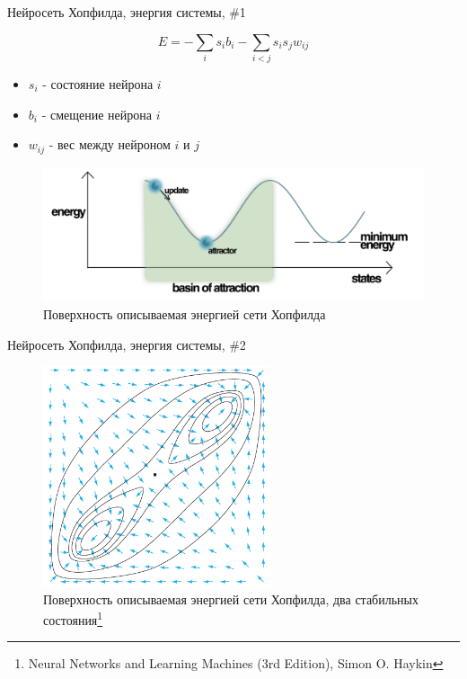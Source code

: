\documentclass[10pt]{beamer}
\begin{document}
\begin{frame}{Нейросеть Хопфилда, энергия системы, \#1}

\begin{equation}
E = -\sum_i s_i b_i - \sum_{i < j} s_i s_j w_{ij}
\end{equation}
\begin{itemize}
	\item $s_i$ - состояние нейрона $i$
	\item $b_i$ - смещение нейрона $i$
	\item $w_{ij}$ - вес между нейроном $i$ и $j$
\end{itemize}

\begin{figure}[h!]
  \centering
  \includegraphics[width=1\textwidth]{images/Energy_landscape.png}
  \caption{Поверхность описываемая энергией сети Хопфилда}
\end{figure}

\end{frame}

\begin{frame}{Нейросеть Хопфилда, энергия системы, \#2}

\begin{figure}[h!]
  \centering
  \includegraphics[width=0.6\textwidth]{images/Enegry_countourmap.png}
  \caption{Поверхность описываемая энергией сети Хопфилда, два стабильных состояния\footnote{Neural Networks and Learning Machines (3rd Edition), Simon O. Haykin}}
\end{figure}

\end{frame}
\end{document}
